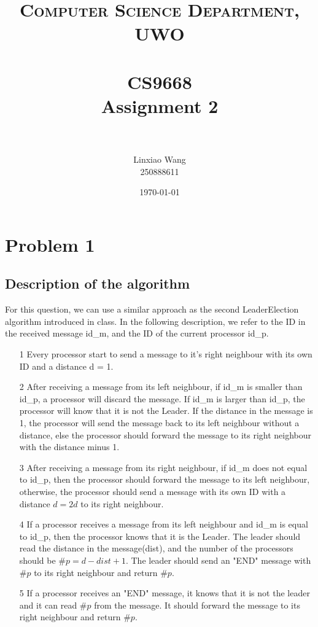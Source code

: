 \documentclass[paper=a4, fontsize=11pt]{scrartcl} %
\title{	
\normalfont \normalsize 
\textsc{Computer Science Department, UWO} \\ [25pt] %
\horrule{0.5pt} \\[0.4cm] %
\huge CS9668\\
Assignment 2 \\ %
\horrule{2pt} \\[0.5cm] %
}
\author{Linxiao Wang\\
	250888611} %
\date{\normalsize\today} %
\numberwithin{equation}{section} %
\numberwithin{figure}{section} %
\numberwithin{table}{section} %
\begin{document}
\maketitle %


\section*{Problem 1}
\subsection*{Description of the algorithm}
For this question, we can use a similar approach as the second  LeaderElection algorithm introduced in class. In the following description, we refer to the ID in the received message id\_m, and the ID of the current processor id\_p.
\begin{itemize}
	\item[1] Every processor start to send a message to it's right neighbour with its own ID and a distance d = 1.
	\item[2] After receiving a message from its left neighbour, if id\_m is smaller than id\_p, a processor will discard the message. If id\_m is larger than id\_p, the processor will know that it is not the Leader. If the distance in the message is 1, the processor will send the message back to its left neighbour without a distance, else the processor should forward the message to its right neighbour with the distance minus 1.
	\item[3] After receiving a message from its right neighbour, if id\_m does not equal to id\_p, then the processor should forward the message to its left neighbour, otherwise, the processor should send a message with its own ID with a distance $d = 2d$ to its right neighbour.
	\item[4] If a processor receives a message from its left neighbour and id\_m is equal to id\_p, then the processor knows that it is the Leader. The leader should read the distance in the message(dist), and the number of the processors should be $\#p = d - dist + 1$.
	The leader should send an "END" message with $\#p$ to its right neighbour and return $\#p$.
	\item[5] If a processor receives an "END" message, it knows that it is not the leader and it can read $\#p$ from the message. It should forward the message to its right neighbour and return $\#p$.
\end{itemize}
\end{document}
